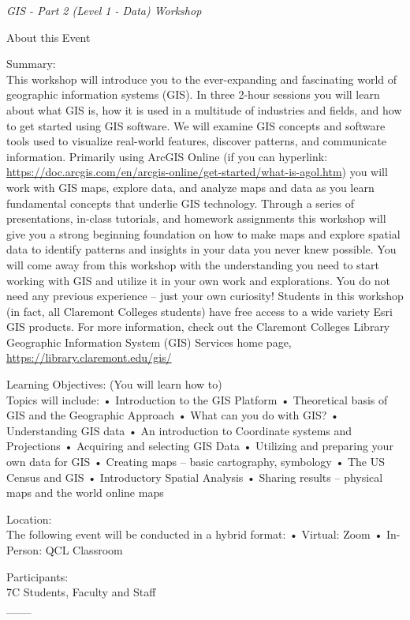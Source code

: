 \documentclass[
]{book}
\begin{document}
\emph{GIS - Part 2 (Level 1 - Data) Workshop}

About this Event

Summary:\\
This workshop will introduce you to the ever-expanding and fascinating world of geographic information systems (GIS). In three 2-hour sessions you will learn about what GIS is, how it is used in a multitude of industries and fields, and how to get started using GIS software. We will examine GIS concepts and software tools used to visualize real-world features, discover patterns, and communicate information. Primarily using ArcGIS Online (if you can hyperlink: \url{https://doc.arcgis.com/en/arcgis-online/get-started/what-is-agol.htm}) you will work with GIS maps, explore data, and analyze maps and data as you learn fundamental concepts that underlie GIS technology.
Through a series of presentations, in-class tutorials, and homework assignments this workshop will give you a strong beginning foundation on how to make maps and explore spatial data to identify patterns and insights in your data you never knew possible. You will come away from this workshop with the understanding you need to start working with GIS and utilize it in your own work and explorations. You do not need any previous experience -- just your own curiosity!
Students in this workshop (in fact, all Claremont Colleges students) have free access to a wide variety Esri GIS products. For more information, check out the Claremont Colleges Library Geographic Information System (GIS) Services home page, \url{https://library.claremont.edu/gis/}

Learning Objectives: (You will learn how to)\\
Topics will include:
• Introduction to the GIS Platform
• Theoretical basis of GIS and the Geographic Approach
• What can you do with GIS?
• Understanding GIS data
• An introduction to Coordinate systems and Projections
• Acquiring and selecting GIS Data
• Utilizing and preparing your own data for GIS
• Creating maps -- basic cartography, symbology
• The US Census and GIS
• Introductory Spatial Analysis
• Sharing results -- physical maps and the world online maps

Location:\\
The following event will be conducted in a hybrid format:
• Virtual: Zoom
• In-Person: QCL Classroom

Participants:\\
7C Students, Faculty and Staff\\
\_\_\_
\end{document}
